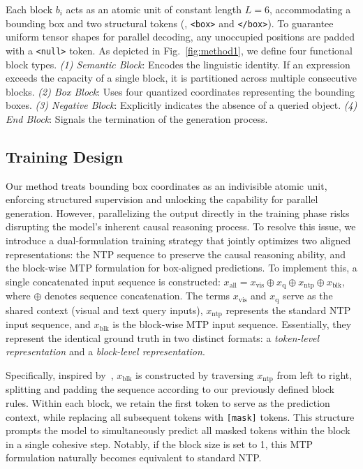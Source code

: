 Each block \(b_i\) acts as an atomic unit of constant length \(L=6\), accommodating a bounding box and two structural tokens (\eg, \texttt{<box>} and \texttt{</box>}). To guarantee uniform tensor shapes for parallel decoding, any unoccupied positions are padded with a \texttt{<null>} token. As depicted in Fig.~\ref{fig:method1}, we define four functional block types. \textit{(1) Semantic Block}: Encodes the linguistic identity. If an expression exceeds the capacity of a single block, it is partitioned across multiple consecutive blocks.
\textit{(2) Box Block}: Uses four quantized coordinates representing the bounding boxes.
\textit{(3) Negative Block}: Explicitly indicates the absence of a queried object.
\textit{(4) End Block}: Signals the termination of the generation process.


\subsection{Training Design}
Our method treats bounding box coordinates as an indivisible atomic unit, enforcing structured supervision and unlocking the capability for parallel generation. However, parallelizing the output directly in the training phase risks disrupting the model's inherent causal reasoning process. To resolve this issue, we introduce a dual-formulation training strategy that jointly optimizes two aligned representations: the NTP sequence to preserve the causal reasoning ability, and the block-wise MTP formulation for box-aligned predictions. To implement this, a single concatenated input sequence is constructed: $x_{\text{all}} = x_{\text{vis}} \oplus x_{\text{q}} \oplus x_{\text{ntp}} \oplus x_{\text{blk}}$, where \(\oplus\) denotes sequence concatenation. The terms \(x_{\text{vis}}\) and \(x_{\text{q}}\) serve as the shared context (visual and text query inputs), \(x_{\text{ntp}}\) represents the standard NTP input sequence, and \(x_{\text{blk}}\) is the block-wise MTP input sequence. Essentially, they represent the identical ground truth in two distinct formats: a \textit{token-level representation} and a \textit{block-level representation}.

Specifically, inspired by~\citep{liu2025sequential, liu2025wedlm}, \(x_{\text{blk}}\) is constructed by traversing \(x_{\text{ntp}}\) from left to right, splitting and padding the sequence according to our previously defined block rules. Within each block, we retain the first token to serve as the prediction context, while replacing all subsequent tokens with \texttt{[mask]} tokens. This structure prompts the model to simultaneously predict all masked tokens within the block in a single cohesive step. Notably, if the block size is set to 1, this MTP formulation naturally becomes equivalent to standard NTP.




